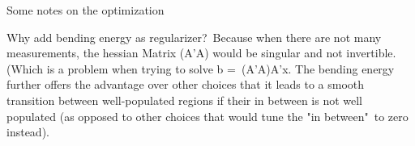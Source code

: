 Some notes on the optimization

Why add bending energy as regularizer? Because when there are not many measurements, the hessian Matrix (A'A) would be singular and not invertible. 
(Which is a problem when trying to solve b = (A'A)A'x.
The bending energy further offers the advantage over other choices that it leads to a smooth transition between well-populated regions if their 
in between is not well populated (as opposed to other choices that would tune the "in between" to zero instead). 


